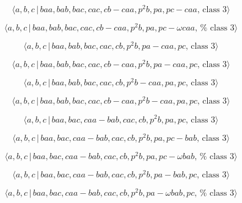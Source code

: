 \documentclass[10pt]{article}
\begin{document}
\begin{equation}
\langle a,b,c\,|\,baa,bab,bac,cac,cb-caa,p^2b,pa,pc-caa,\,\text{class }%
3\rangle  \tag{7.2759}
\end{equation}

\begin{equation}
\langle a,b,c\,|\,baa,bab,bac,cac,cb-caa,p^{2}b,pa,pc-\omega caa,\,\text{%
class }3\rangle  \tag{7.2760}
\end{equation}

\begin{equation}
\langle a,b,c\,|\,baa,bab,bac,cac,cb,p^2b,pa-caa,pc,\,\text{class }3\rangle 
\tag{7.2761}
\end{equation}

\begin{equation}
\langle a,b,c\,|\,baa,bab,bac,cac,cb-caa,p^2b,pa-caa,pc,\,\text{class }%
3\rangle  \tag{7.2762}
\end{equation}

\begin{equation}
\langle a,b,c\,|\,baa,bab,bac,cac,cb,p^2b-caa,pa,pc,\,\text{class }3\rangle 
\tag{7.2763}
\end{equation}

\begin{equation}
\langle a,b,c\,|\,baa,bab,bac,cac,cb-caa,p^2b-caa,pa,pc,\,\text{class }%
3\rangle  \tag{7.2764}
\end{equation}

\begin{equation}
\langle a,b,c\,|\,baa,bac,caa-bab,cac,cb,p^2b,pa,pc,\,\text{class }3\rangle 
\tag{7.2765}
\end{equation}

\begin{equation}
\langle a,b,c\,|\,baa,bac,caa-bab,cac,cb,p^2b,pa,pc-bab,\,\text{class }%
3\rangle  \tag{7.2766}
\end{equation}

\begin{equation}
\langle a,b,c\,|\,baa,bac,caa-bab,cac,cb,p^{2}b,pa,pc-\omega bab,\,\text{%
class }3\rangle  \tag{7.2767}
\end{equation}

\begin{equation}
\langle a,b,c\,|\,baa,bac,caa-bab,cac,cb,p^2b,pa-bab,pc,\,\text{class }%
3\rangle  \tag{7.2768}
\end{equation}

\begin{equation}
\langle a,b,c\,|\,baa,bac,caa-bab,cac,cb,p^{2}b,pa-\omega bab,pc,\,\text{%
class }3\rangle  \tag{7.2769}
\end{equation}
\end{document}
